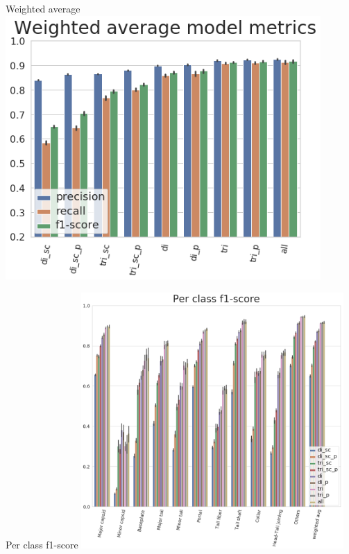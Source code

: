 \documentclass{beamer}
\begin{document}
\begin{frame}{Weighted average}
\includegraphics[width=0.90\textwidth]{avg_score_master}
\end{frame}

\begin{frame}{Per class f1-score}
\includegraphics[width=0.75\textwidth]{f1_score_master_per_class}
\end{frame}
\end{document}
